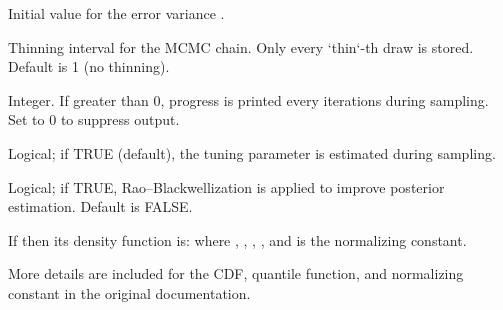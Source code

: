 \documentclass[a4paper]{book}
\begin{document}
\begin{Arguments}
\begin{ldescription}
\item[\code{sigma2\_init}] Initial value for the error variance .

\item[\code{thin}] Thinning interval for the MCMC chain. Only every `thin`-th draw is stored. Default is 1 (no thinning).

\item[\code{verbose}] Integer. If greater than 0, progress is printed every  iterations during sampling. Set to 0 to suppress output.

\item[\code{tune\_lambda2}] Logical; if TRUE (default), the tuning parameter
 is estimated during sampling.

\item[\code{rao\_blackwellization}] Logical; if TRUE, Rao–Blackwellization
is applied to improve posterior estimation. Default is FALSE.
\end{ldescription}
\end{Arguments}
%
\begin{Details}
If  then its density function is:
where , , , , and  is the normalizing constant.

More details are included for the CDF, quantile function, and normalizing constant in the original documentation.
\end{Details}
%
\end{document}
